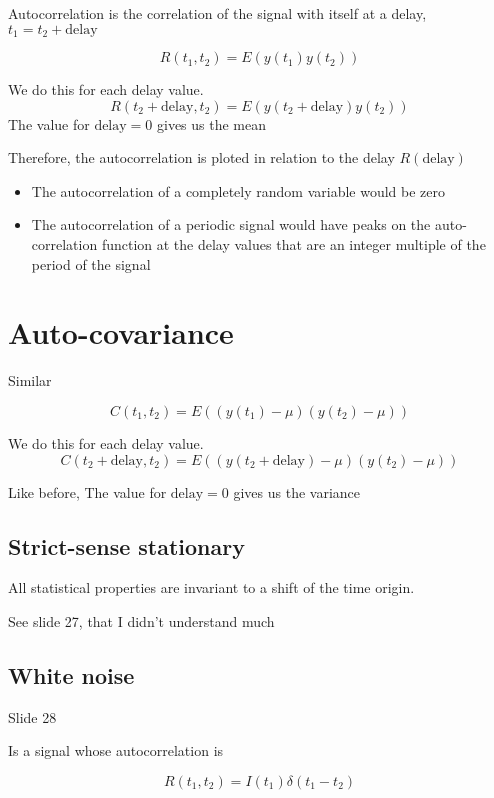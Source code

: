 \documentclass[../main/main.tex]{subfiles}
\begin{document}
Autocorrelation is the correlation of the signal with itself at a delay, $t_1 = t_2+\textrm{delay}$

\begin{equation}
	R(t_1, t_2) = E(y(t_1)y(t_2))
\end{equation}

We do this for each delay value.
\begin{equation}
	R(t_2+\textrm{delay}, t_2) = E(y(t_2+\textrm{delay})y(t_2))
\end{equation}
The value for $\textrm{delay}=0$ gives us the mean

Therefore, the autocorrelation is ploted in relation to the delay $R(\textrm{delay})$


\begin{itemize}
	\item The autocorrelation of a completely random variable would be zero
	\item The autocorrelation of a periodic signal would have peaks on the auto-correlation function at the delay values that are an integer multiple of the period of the signal
\end{itemize}

\section{Auto-covariance}

Similar

\begin{equation}
	C(t_1, t_2) = E((y(t_1)-\mu)(y(t_2)-\mu))
\end{equation}

We do this for each delay value.
\begin{equation}
	C(t_2+\textrm{delay}, t_2) = E((y(t_2+\textrm{delay})-\mu)(y(t_2)-\mu))
\end{equation}

Like before, The value for $\textrm{delay}=0$ gives us the variance

\subsection{Strict-sense stationary}

All statistical properties are invariant to a shift of the time origin.

See slide 27, that I didn't understand much

\subsection{White noise}
Slide 28

Is a signal whose autocorrelation is

\begin{equation}
	R(t_1,t_2) = I(t_1)\delta(t_1-t_2)
\end{equation}
\end{document}
